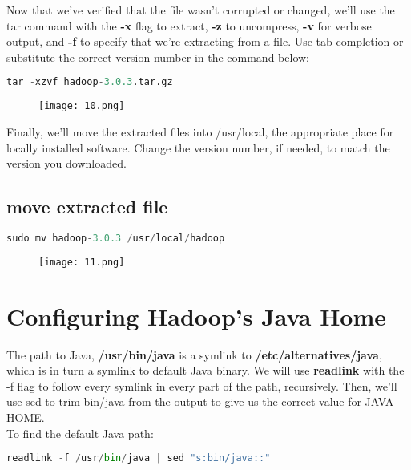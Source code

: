 \documentclass[onecolumn]{article}
\begin{document}
Now that we’ve verified that the file wasn’t corrupted or changed, we’ll use the tar command with the \textbf{-x} flag to extract, \textbf{-z} to uncompress, \textbf{-v} for verbose output, and \textbf{-f} to specify that we’re extracting from a file. Use tab-completion or substitute the correct version number in the command below:

\begin{lstlisting}[language=Python, caption= Output]
tar -xzvf hadoop-3.0.3.tar.gz
\end{lstlisting}

\begin{figure}[ht!]
\centering
\texttt{[image: 10.png]}
\caption{\label{}}
\end{figure}

Finally, we’ll move the extracted files into /usr/local, the appropriate place for locally installed software. Change the version number, if needed, to match the version you downloaded.

\subsection{move extracted file}

\begin{lstlisting}[language=Python, caption= Move]
sudo mv hadoop-3.0.3 /usr/local/hadoop
\end{lstlisting}

\begin{figure}[ht!]
\centering
\texttt{[image: 11.png]}
\caption{\label{}}
\end{figure}

\section{Configuring Hadoop’s Java Home}

The path to Java, \textbf{/usr/bin/java} is a symlink to \textbf{/etc/alternatives/java}, which is in turn a symlink to default Java binary. We will use \textbf{readlink} with the -f flag to follow every symlink in every part of the path, recursively. Then, we’ll use sed to trim bin/java from the output to give us the correct value for JAVA HOME.\\

To find the default Java path:
\begin{lstlisting}[language=Python, caption= java path]
readlink -f /usr/bin/java | sed "s:bin/java::"
\end{lstlisting}
\end{document}
